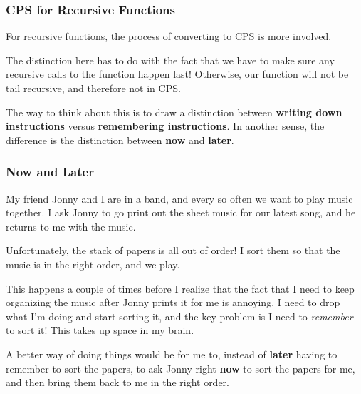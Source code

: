 \documentclass[aspectratio=169]{beamer}
\begin{document}
\begin{frame}[fragile]
  \frametitle{CPS for Recursive Functions}

  For recursive functions, the process of converting to CPS is more involved.

  \pause
  \vspace{\fill}

  The distinction here has to do with the fact that we have to make sure any
  recursive calls to the function happen last! Otherwise, our function will
  not be tail recursive, and therefore not in CPS.

  \pause
  \vspace{\fill}

  The way to think about this is to draw a distinction between
  \textbf{writing down instructions} versus \textbf{remembering instructions}.
  In another sense, the difference is the distinction between \textbf{now}
  and \textbf{later}.
\end{frame}

\begin{frame}[fragile]
  \frametitle{Now and Later}

  \pause
  My friend Jonny and I are in a band, and every so often we want to play music
  together. I ask Jonny to go print out the sheet music for our latest song,
  and he returns to me with the music.

  \pause
  \vspace{\fill}

  Unfortunately, the stack of papers is all out of order! I sort them so that the
  music is in the right order, and we play.

  \pause
  \vspace{\fill}

  This happens a couple of times before I realize that the fact that I need to keep
  organizing the music after Jonny prints it for me is annoying. I need to drop
  what I'm doing and start sorting it, and the key problem is I need to \textit{remember}
  to sort it! This takes up space in my brain.

  \pause
  \vspace{\fill}

  A better way of doing things would be for me to, instead of \textbf{later}
  having to remember to sort the papers, to ask Jonny right \textbf{now} to
  sort the papers for me, and then bring them back to me in the right order.
\end{frame}
\end{document}
